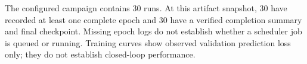 The configured campaign contains 30 runs. At this artifact snapshot, 30 have recorded at least one complete epoch and 30 have a verified completion summary and final checkpoint. Missing epoch logs do not establish whether a scheduler job is queued or running. Training curves show observed validation prediction loss only; they do not establish closed-loop performance.
